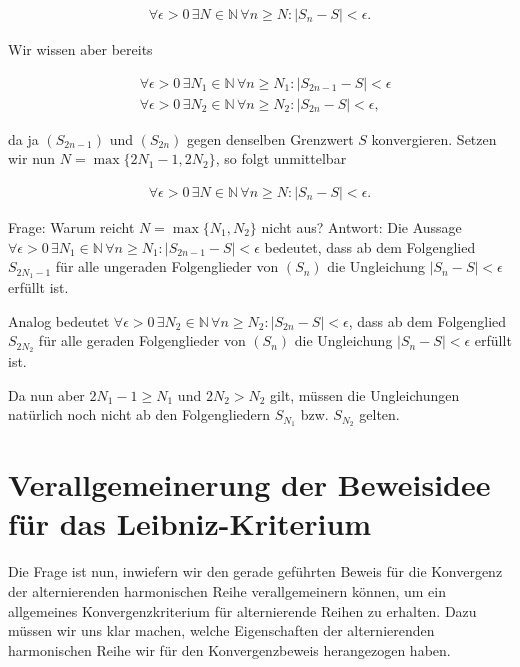 \documentclass[fontsize=9pt,
               parskip=half-,
               DIV=14,
               listof=chapterentry,
               tocflat]{scrbook}
\begin{document}
\begin{align*}
\forall \epsilon >0\,\exists N\in \mathbb {N} \,\forall n\geq N:|S_{n}-S|<\epsilon .
\end{align*}

Wir wissen aber bereits

\begin{align*}
&\forall \epsilon >0\,\exists N_{1}\in \mathbb {N} \,\forall n\geq N_{1}:|S_{2n-1}-S|<\epsilon \\[0.3em]&\forall \epsilon >0\,\exists N_{2}\in \mathbb {N} \,\forall n\geq N_{2}:|S_{2n}-S|<\epsilon ,
\end{align*}

da ja $(S_{2n-1})$ und $(S_{2n})$ gegen denselben Grenzwert $S$ konvergieren. Setzen wir nun $N=\max\{2N_{1}-1,2N_{2}\}$, so folgt unmittelbar

\begin{align*}
\forall \epsilon >0\,\exists N\in \mathbb {N} \,\forall n\geq N:|S_{n}-S|<\epsilon .
\end{align*}

Frage: Warum reicht $N=\max\{N_{1},N_{2}\}$ nicht aus? Antwort: Die Aussage $\forall \epsilon >0\,\exists N_{1}\in \mathbb {N} \,\forall n\geq N_{1}:|S_{2n-1}-S|<\epsilon $ bedeutet, dass ab dem Folgenglied $S_{2N_{1}-1}$ für alle ungeraden Folgenglieder von $(S_{n})$ die Ungleichung $|S_{n}-S|<\epsilon $ erfüllt ist.

Analog bedeutet $\forall \epsilon >0\,\exists N_{2}\in \mathbb {N} \,\forall n\geq N_{2}:|S_{2n}-S|<\epsilon $, dass ab dem Folgenglied $S_{2N_{2}}$ für alle geraden Folgenglieder von $(S_{n})$ die Ungleichung $|S_{n}-S|<\epsilon $ erfüllt ist.

Da nun aber $2N_{1}-1\geq N_{1}$ und $2N_{2}>N_{2}$ gilt, müssen die Ungleichungen natürlich noch nicht ab den Folgengliedern $S_{N_{1}}$ bzw. $S_{N_{2}}$ gelten.

\section{Verallgemeinerung der Beweisidee für das Leibniz-Kriterium}

Die Frage ist nun, inwiefern wir den gerade geführten Beweis für die Konvergenz der alternierenden harmonischen Reihe verallgemeinern können, um ein allgemeines Konvergenzkriterium für alternierende Reihen zu erhalten. Dazu müssen wir uns klar machen, welche Eigenschaften der alternierenden harmonischen Reihe wir für den Konvergenzbeweis herangezogen haben.
\end{document}
